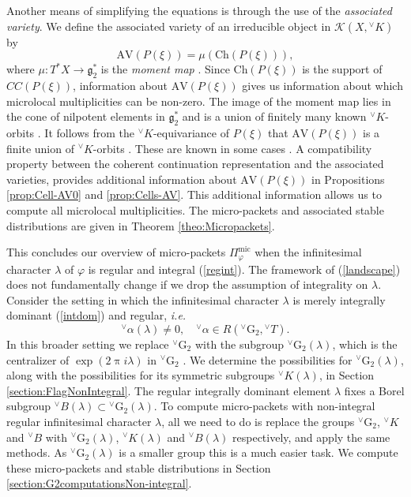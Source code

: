 \documentclass[a4paper, 11pt]{article}
\begin{document}
Another means of simplifying the equations  is
through the use of the \emph{associated variety}.  We define the
associated variety of an irreducible object in $\mathscr{K}(X,
{^\vee}K)$ by
\begin{equation}
\label{eq:AVdef}
\mathrm{AV}(P(\xi))  = \mu \left(
\mathrm{Ch}(P(\xi)) \right),
\end{equation}
where $\mu : T^{*}X \rightarrow \mathfrak{g}_{2}^{*}$ is the
\emph{moment map} \cite[(20.3)]{ABV}.
Since $\mathrm{Ch}(P(\xi))$
is the support of $CC(P(\xi))$, information about $\mathrm{AV}(P(\xi))$
gives us information about which microlocal multiplicities can be non-zero.
The image of the moment map
lies in the cone of nilpotent elements in $\mathfrak{g}_{2}^{*}$ and
is a union of finitely many known ${^\vee}K$-orbits
\cite{Dokovic}. It follows 
from the ${^\vee}K$-equivariance of $P(\xi)$ that
$\mathrm{AV}(P(\xi))$ is a finite union of ${^\vee}K$-orbits
\cite[Lemma 20.16]{ABV}.  These  are
known in some cases \cite{Samples}.  A compatibility property between
the coherent continuation representation and the associated varieties,
provides additional information about  $\mathrm{AV}(P(\xi))$ in
Propositions \ref{prop:Cell-AV0} and \ref{prop:Cells-AV}.   This
additional information allows us to compute 
all microlocal multiplicities. The micro-packets and associated
stable distributions are given in Theorem \ref{theo:Micropackets}.

This concludes our overview of micro-packets
$\Pi^{\mathrm{mic}}_{\varphi}$ when the infinitesimal character
$\lambda$ of $\varphi$ is regular and integral (\ref{regint}).  The
framework of (\ref{landscape}) does not fundamentally change if we
drop the assumption of integrality on $\lambda$.  Consider the setting
in which the infinitesimal character $\lambda$ is merely integrally dominant
(\ref{intdom}) and  regular, \emph{i.e.}
\begin{equation}
\label{reg}
{^\vee}\alpha(\lambda) \neq 0, \quad {^\vee}\alpha \in
R({^\vee}\mathrm{G}_{2}, {^\vee}T).
\end{equation}
In this broader
setting we replace ${^\vee}\mathrm{G}_{2}$ with the subgroup
${^\vee}\mathrm{G}_{2}(\lambda)$, which is the centralizer of
$\exp(2 \uppi i \lambda)$ in ${^\vee}\mathrm{G}_{2}$ \cite[(6.2)(b),
  Proposition 6.16]{ABV}.  We determine
the possibilities for  ${^\vee}\mathrm{G}_{2}(\lambda)$, along with
the possibilities for its symmetric subgroups ${^\vee}K(\lambda)$, in
Section \ref{section:FlagNonIntegral}.   The regular integrally
dominant element $\lambda$ fixes 
a Borel subgroup ${^\vee}B(\lambda) \subset
{^\vee}\mathrm{G}_{2}(\lambda)$.  To compute micro-packets with
non-integral regular infinitesimal character $\lambda$, all we need 
to do is replace the groups ${^\vee}\mathrm{G}_{2}$, ${^\vee}K$ and
${^\vee}B$ with 
${^\vee}\mathrm{G}_{2}(\lambda)$, ${^\vee}K(\lambda)$ and
${^\vee}B(\lambda)$ respectively, and apply the same methods.  As
${^\vee}\mathrm{G}_{2}(\lambda)$ is a smaller group this is a much
easier task.  We compute these micro-packets and stable distributions in
 Section \ref{section:G2computationsNon-integral}.
\end{document}
